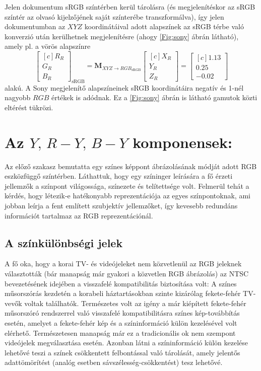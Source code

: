 Jelen dokumentum sRGB színtérben kerül tárolásra (és megjelenítéskor az sRGB színtér az olvasó kijelzőjének saját színterébe transzformálva), így jelen dokumentumban az $XYZ$ koordinátáival adott alapszínek az sRGB térbe való konverzió után kerülhetnek megjelenítésre (ahogy \ref{Fig:sony} ábrán látható), amely pl. a vörös alapszínre
\begin{equation}
\begin{bmatrix}[c]
       R_R \\[0.3em]
       G_R \\[0.3em]
       B_R \end{bmatrix}_{\mathrm{sRGB}}
       =
     \mathbf{M}_{X\!Y\!Z \rightarrow R\!G\!B_{\mathrm{sRGB}}}
      \begin{bmatrix}[c]
       X_R \\[0.3em]
       Y_R \\[0.3em]
       Z_R \end{bmatrix} =      
       \begin{bmatrix}[c]
       1.13 \\[0.3em]
       0.25 \\[0.3em]
       -0.02 \end{bmatrix} 
\end{equation}
alakú.
A Sony megjelenítő alapszíneinek sRGB koordinátáira negatív és 1-nél nagyobb $RGB$ értékek is adódnak.
Ez a \ref{Fig:sony} ábrán is látható gamutok közti eltérést tükrözi.

\section{Az $Y,\,R-Y,\,B-Y$ komponensek:}

Az előző szakasz bemutatta egy színes képpont ábrázolásának módját adott RGB eszközfüggő színtérben.
Láthattuk, hogy egy színinger leírására a fő érzeti jellemzők a színpont világossága, színezete és telítettsége volt.
Felmerül tehát a kérdés, hogy létezik-e hatékonyabb reprezentációja az egyes színpontoknak, ami jobban leírja a fent említett szubjektív jellemzőket, így kevesebb redundáns információt tartalmaz az RGB reprezentációnál.

\subsection{A színkülönbségi jelek}
A fő oka, hogy a korai TV- és videójeleket nem közvetlenül az RGB jeleknek választották (bár manapság már gyakori a közvetlen RGB ábrázolás) az NTSC bevezetésének idejében a visszafelé kompatibilitás biztosítása volt:
A színes műsorszórás kezdetén a korabeli háztartásokban szinte kizárólag fekete-fehér TV-vevők voltak találhatók.
Természetes volt az igény a már kiépített fekete-fehér műsorszóró rendszerrel való visszafelé kompatibilitásra színes kép-továbbítás esetén, amelyet a fekete-fehér kép és a színinformáció külön kezelésével volt elérhető.
Természetesen manapság már ez a tradicionális ok nem szempont videójelek megválasztása esetén.
Azonban látni a színinformáció külön kezelése lehetővé teszi a színek csökkentett felbontással való tárolását, amely jelentős adattömörítést (analóg esetben sávszélesség-csökkentést) tesz lehetővé.

